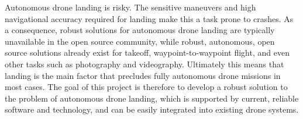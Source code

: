 
Autonomous drone landing is risky. The sensitive maneuvers and high navigational accuracy required for landing make this a task prone to crashes. As a consequence, robust solutions for autonomous drone landing are typically unavailable in the open source community, while robust, autonomous, open source solutions already exist for takeoff, waypoint-to-waypoint flight, and even other tasks such as photography and videography. Ultimately this means that landing is the main factor that precludes fully autonomous drone missions in most cases. The goal of this project is therefore to develop a robust solution to the problem of autonomous drone landing, which is supported by current, reliable software and technology, and can be easily integrated into existing drone systems.

